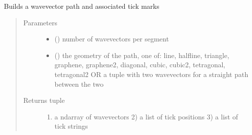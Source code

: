 \documentclass[letterpaper,10pt,english]{sphinxmanual}
\begin{document}

\begin{fulllineitems}
\label{\detokenize{functions:pyqcm.wavevector_path}}
\sphinxAtStartPar
Builds a wavevector path and associated tick marks
\begin{quote}\begin{description}
\item[{Parameters}] \leavevmode\begin{itemize}
\item {} 
\sphinxAtStartPar
{} () \textendash{} number of wavevectors per segment

\item {} 
\sphinxAtStartPar
{} () \textendash{} the geometry of the path, one of: line, halfline, triangle, graphene, graphene2, diagonal, cubic, cubic2, tetragonal, tetragonal2  OR a tuple with two wavevectors for a straight path between the two

\end{itemize}

\item[{Returns tuple}] \leavevmode\begin{enumerate}
%
\item {} 
\sphinxAtStartPar
a ndarray of wavevectors 2) a list of tick positions 3) a list of tick strings

\end{enumerate}

\end{description}\end{quote}

\end{fulllineitems}

\end{document}
